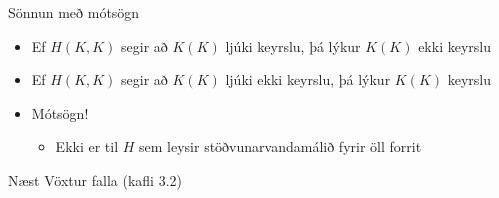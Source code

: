 \documentclass[handout]{beamer}
\begin{document}
\begin{frame}{Sönnun með mótsögn}
\begin{itemize}
 \item Ef $H(K, K)$ segir að $K(K)$ ljúki keyrslu, þá lýkur $K(K)$ ekki keyrslu
 \item Ef $H(K, K)$ segir að $K(K)$ ljúki ekki keyrslu, þá lýkur $K(K)$ keyrslu
 \item Mótsögn!
 \begin{itemize}
  \item Ekki er til $H$ sem leysir stöðvunarvandamálið fyrir öll forrit
 \end{itemize}
\end{itemize}

\end{frame}


\begin{frame}{Næst}
Vöxtur falla (kafli 3.2)
\end{frame}
\end{document}
